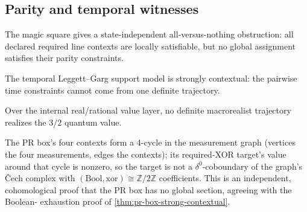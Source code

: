 \subsection{Parity and temporal witnesses}

\begin{theorem}\label{thm:magic-square-strong-contextual}\leanok{}
The magic square gives a state-independent all-versus-nothing obstruction:
all declared required line contexts are locally satisfiable, but no global assignment
satisfies their parity constraints.
\end{theorem}

\begin{theorem}\label{thm:leggett-garg-macrorealism-violated}\leanok{}
The temporal Leggett--Garg support model is strongly contextual: the pairwise
time constraints cannot come from one definite trajectory.
\end{theorem}

\begin{theorem}\label{thm:leggett-garg-real-separation}\leanok{}
Over the internal real/rational value layer, no definite macrorealist
trajectory realizes the \(3/2\) quantum value.
\end{theorem}

\begin{theorem}\label{thm:pr-cohomological-contextuality}\leanok{}
The PR box's four contexts form a 4-cycle in the measurement graph (vertices
the four measurements, edges the contexts); its required-XOR target's value
around that cycle is nonzero, so the target is not a \(\delta^0\)-coboundary
of the graph's Čech complex with \((\mathrm{Bool}, \mathrm{xor}) \cong
\mathbb{Z}/2\mathbb{Z}\) coefficients. This is an independent, cohomological
proof that the PR box has no global section, agreeing with the Boolean-
exhaustion proof of \ref{thm:pr-box-strong-contextual}.
\end{theorem}
